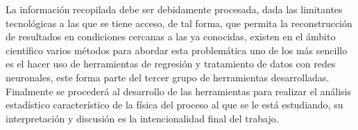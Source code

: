 La información recopilada debe ser debidamente procesada, dada las limitantes tecnológicas a las que se tiene acceso, de tal forma, que permita la reconstrucción de resultados en condiciones cercanas a las ya conocidas, existen en el ámbito científico varios métodos para abordar esta problemática uno de los más sencillo es el hacer uso de herramientas de regresión y tratamiento de datos con redes neuronales, este forma parte del tercer grupo de herramientas desarrolladas. Finalmente se procederá al desarrollo de las herramientas para realizar el análisis estadístico característico de la física del proceso al que se le está estudiando, su interpretación y discusión es la intencionalidad final del trabajo. 

